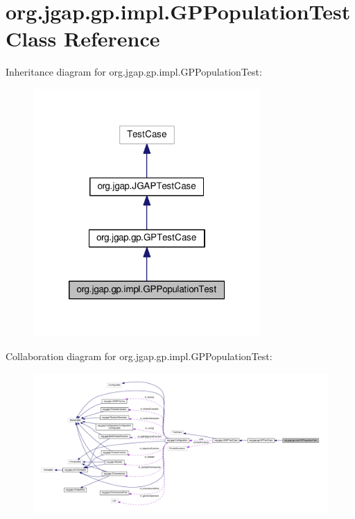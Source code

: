 \hypertarget{classorg_1_1jgap_1_1gp_1_1impl_1_1_g_p_population_test}{\section{org.\-jgap.\-gp.\-impl.\-G\-P\-Population\-Test Class Reference}
\label{classorg_1_1jgap_1_1gp_1_1impl_1_1_g_p_population_test}
}


Inheritance diagram for org.\-jgap.\-gp.\-impl.\-G\-P\-Population\-Test\-:
\nopagebreak
\begin{figure}[H]
\begin{center}
\leavevmode
\includegraphics[width=246pt]{classorg_1_1jgap_1_1gp_1_1impl_1_1_g_p_population_test__inherit__graph}
\end{center}
\end{figure}


Collaboration diagram for org.\-jgap.\-gp.\-impl.\-G\-P\-Population\-Test\-:
\nopagebreak
\begin{figure}[H]
\begin{center}
\leavevmode
\includegraphics[width=350pt]{classorg_1_1jgap_1_1gp_1_1impl_1_1_g_p_population_test__coll__graph}
\end{center}
\end{figure}
